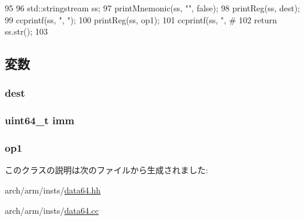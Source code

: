 \begin{DoxyCode}
95 {
96     std::stringstream ss;
97     printMnemonic(ss, "", false);
98     printReg(ss, dest);
99     ccprintf(ss, ", ");
100     printReg(ss, op1);
101     ccprintf(ss, ", #%
102     return ss.str();
103 }
\end{DoxyCode}


\subsection{変数}
\hypertarget{classArmISA_1_1DataX1RegImmOp_aec72e8e45bdc87abeeeb75d2a8a9a716}{
\subsubsection[{dest}]{ {\bf dest}}}
\label{classArmISA_1_1DataX1RegImmOp_aec72e8e45bdc87abeeeb75d2a8a9a716}
\hypertarget{classArmISA_1_1DataX1RegImmOp_a2b4406ad2843b5aa12d244d01d8fdc69}{
\subsubsection[{imm}]{\setlength{\rightskip}{0pt plus 5cm}uint64\_\-t {\bf imm}}}
\label{classArmISA_1_1DataX1RegImmOp_a2b4406ad2843b5aa12d244d01d8fdc69}
\hypertarget{classArmISA_1_1DataX1RegImmOp_a4c465c43ad568f8bcf8ae71480e9cfea}{
\subsubsection[{op1}]{ {\bf op1}}}
\label{classArmISA_1_1DataX1RegImmOp_a4c465c43ad568f8bcf8ae71480e9cfea}


このクラスの説明は次のファイルから生成されました:\begin{DoxyCompactItemize}
\item 
arch/arm/insts/\hyperlink{data64_8hh}{data64.hh}\item 
arch/arm/insts/\hyperlink{data64_8cc}{data64.cc}\end{DoxyCompactItemize}

